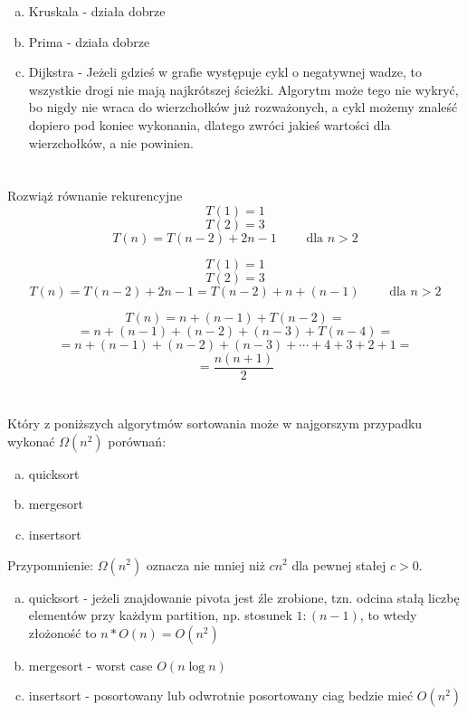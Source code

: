 \documentclass[svgnames]{report}
\begin{document}
\begin{enumerate}[a)]
\item Kruskala - działa dobrze
\item Prima - działa dobrze
\item Dijkstra - Jeżeli gdzieś w grafie występuje cykl o negatywnej wadze, to wszystkie drogi nie mają najkrótszej ścieżki. Algorytm może tego nie wykryć, bo nigdy nie wraca do wierzchołków już rozważonych, a cykl możemy znaleść dopiero pod koniec wykonania, dlatego zwróci jakieś wartości dla wierzchołków, a nie powinien.
\end{enumerate}

\section{}
\begin{framed}
Rozwiąż równanie rekurencyjne
$$ T(1)=1$$
$$ T(2)=3$$
$$ T(n)=T(n-2)+2n-1 \qquad \mbox{ dla $n >2$} $$
\end{framed}
$$ T(1)=1$$
$$ T(2)=3$$
$$ T(n)=T(n-2)+2n-1=T(n-2)+n+(n-1) \qquad \mbox{ dla $n >2$} $$

$$ T(n)=n+(n-1)+T(n-2)=$$
$$ = n+(n-1)+(n-2)+(n-3)+T(n-4)=$$
$$ = n+(n-1)+(n-2)+(n-3)+\cdots+4+3+2+1=$$
$$= \frac {n(n+1)} 2$$

\section{}
\begin{framed}
Który z poniższych algorytmów sortowania może w najgorszym przypadku wykonać $\Omega(n^2)$ porównań:
\begin{enumerate}[a)]
	\item quicksort
	\item mergesort
	\item insertsort
\end{enumerate}
Przypomnienie: $\Omega(n^2)$ oznacza nie mniej niż $cn^2$ dla pewnej stałej $c>0$.
\end{framed}
\begin{enumerate}[a)]
	\item quicksort - jeżeli znajdowanie pivota jest źle zrobione, tzn. odcina stałą liczbę elementów przy każdym partition, np. stosunek $1:(n-1)$, to wtedy złożoność to $n*O(n) = O(n^2)$
	\item mergesort - worst case $O(n\log n)$
	\item insertsort - posortowany lub odwrotnie posortowany ciag bedzie mieć $O(n^2)$
\end{enumerate}
\end{document}
